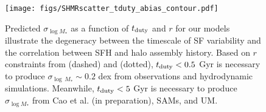 \documentclass[12pt, letterpaper, preprint, tighten]{aastex62}
\newcommand{\edt}[1]{{\color{dred}{\bf} #1}}
\newcommand{\tduty}{t_{\rm duty}}
\newcommand{\logsfr}{\log\mathrm{SFR}}
\newcommand{\siglogm}{\sigma_{\log M_*}}
\begin{document}
%

\begin{figure}
\begin{center}
\texttt{[image: figs/SHMRscatter\_tduty\_abias\_contour.pdf]}
    \caption{
    \edt{Predicted $\siglogm$ as a function of $\tduty$ and $r$ for our
    models illustrate the degeneracy between the timescale of SF variability and
    the correlation between SFH and halo assembly history. Based on $r$ constraints
    from \cite{tinker2018b} (dashed) and \cite{behroozi2018} (dotted), $\tduty < 0.5$ Gyr
    is necessary to produce $\sigma_{\log\,M_*} \sim 0.2$ dex from observations and
    hydrodynamic simulations. Meanwhile, $\tduty < 5$ Gyr is necessary to produce
    $\siglogm$ from Cao et al. (in preparation), SAMs, and UM.}
    }
\label{fig:r_tduty}
\end{center}
\end{figure}
\end{document}
